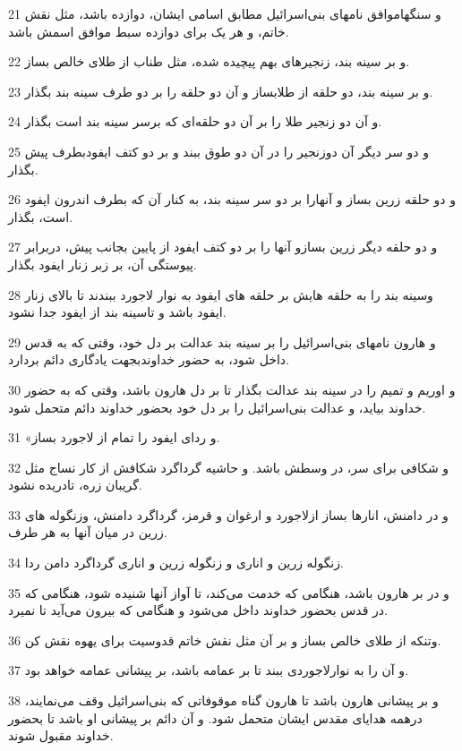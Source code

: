 \par 21 و سنگهاموافق نامهای بنی‌اسرائیل مطابق اسامی ایشان، دوازده باشد، مثل نقش خاتم، و هر یک برای دوازده سبط موافق اسمش باشد.
\par 22 و بر سینه بند، زنجیرهای بهم پیچیده شده، مثل طناب از طلای خالص بساز.
\par 23 و بر سینه بند، دو حلقه از طلابساز و آن دو حلقه را بر دو طرف سینه بند بگذار. 
\par 24 و آن دو زنجیر طلا را بر آن دو حلقه‌ای که برسر سینه بند است بگذار.
\par 25 و دو سر دیگر آن دوزنجیر را در آن دو طوق ببند و بر دو کتف ایفودبطرف پیش بگذار.
\par 26 و دو حلقه زرین بساز و آنهارا بر دو سر سینه بند، به کنار آن که بطرف اندرون ایفود است، بگذار.
\par 27 و دو حلقه دیگر زرین بسازو آنها را بر دو کتف ایفود از پایین بجانب پیش، دربرابر پیوستگی آن، بر زبر زنار ایفود بگذار.
\par 28 وسینه بند را به حلقه هایش بر حلقه های ایفود به نوار لاجورد ببندند تا بالای زنار ایفود باشد و تاسینه بند از ایفود جدا نشود.
\par 29 و هارون نامهای بنی‌اسرائیل را بر سینه بند عدالت بر دل خود، وقتی که به قدس داخل شود، به حضور خداوندبجهت یادگاری دائم بردارد.
\par 30 و اوریم و تمیم را در سینه بند عدالت بگذار تا بر دل هارون باشد، وقتی که به حضور خداوند بیاید، و عدالت بنی‌اسرائیل را بر دل خود بحضور خداوند دائم متحمل شود.
\par 31 «و ردای ایفود را تمام از لاجورد بساز.
\par 32 و شکافی برای سر، در وسطش باشد. و حاشیه گرداگرد شکافش از کار نساج مثل گریبان زره، تادریده نشود.
\par 33 و در دامنش، انارها بساز ازلاجورد و ارغوان و قرمز، گرداگرد دامنش، وزنگوله های زرین در میان آنها به هر طرف.
\par 34 زنگوله زرین و اناری و زنگوله زرین و اناری گرداگرد دامن ردا.
\par 35 و در بر هارون باشد، هنگامی که خدمت می‌کند، تا آواز آنها شنیده شود، هنگامی که در قدس بحضور خداوند داخل می‌شود و هنگامی که بیرون می‌آید تا نمیرد.
\par 36 وتنکه از طلای خالص بساز و بر آن مثل نقش خاتم قدوسیت برای یهوه نقش کن.
\par 37 و آن را به نوارلاجوردی ببند تا بر عمامه باشد، بر پیشانی عمامه خواهد بود.
\par 38 و بر پیشانی هارون باشد تا هارون گناه موقوفاتی که بنی‌اسرائیل وقف می‌نمایند، درهمه هدایای مقدس ایشان متحمل شود. و آن دائم بر پیشانی او باشد تا بحضور خداوند مقبول شوند.
